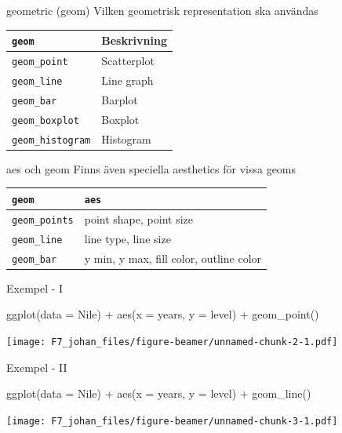 \documentclass[
  11pt,
  ignorenonframetext,
  handout]{beamer}
\newenvironment{Shaded}{\begin{snugshade}}{\end{snugshade}}
\newcommand{\AttributeTok}[1]{\textcolor[rgb]{0.77,0.63,0.00}{#1}}
\newcommand{\FunctionTok}[1]{\textcolor[rgb]{0.00,0.00,0.00}{#1}}
\newcommand{\NormalTok}[1]{#1}
\newcommand{\SpecialCharTok}[1]{\textcolor[rgb]{0.00,0.00,0.00}{#1}}
\begin{document}
\begin{frame}[fragile]{geometric (geom)}
\protect\hypertarget{geometric-geom}{}
Vilken geometrisk representation ska användas

\begin{longtable}[]{@{}ll@{}}
\toprule
\texttt{geom} & Beskrivning \\
\midrule
\endhead
\texttt{geom\_point} & Scatterplot \\
\texttt{geom\_line} & Line graph \\
\texttt{geom\_bar} & Barplot \\
\texttt{geom\_boxplot} & Boxplot \\
\texttt{geom\_histogram} & Histogram \\
\bottomrule
\end{longtable}
\end{frame}

\begin{frame}[fragile]{aes och geom}
\protect\hypertarget{aes-och-geom}{}
Finns även speciella aesthetics för vissa geoms

\begin{longtable}[]{@{}ll@{}}
\toprule
\texttt{geom} & \texttt{aes} \\
\midrule
\endhead
\texttt{geom\_points} & point shape, point size \\
\texttt{geom\_line} & line type, line size \\
\texttt{geom\_bar} & y min, y max, fill color, outline color \\
\bottomrule
\end{longtable}
\end{frame}

\begin{frame}[fragile]{Exempel - I}
\protect\hypertarget{exempel---i}{}
\begin{Shaded}
\begin{Highlighting}[]
\FunctionTok{ggplot}\NormalTok{(}\AttributeTok{data =}\NormalTok{ Nile) }\SpecialCharTok{+} 
  \FunctionTok{aes}\NormalTok{(}\AttributeTok{x =}\NormalTok{ years, }\AttributeTok{y =}\NormalTok{ level) }\SpecialCharTok{+} 
  \FunctionTok{geom\_point}\NormalTok{()}
\end{Highlighting}
\end{Shaded}

\texttt{[image: F7\_johan\_files/figure-beamer/unnamed-chunk-2-1.pdf]}
\end{frame}

\begin{frame}[fragile]{Exempel - II}
\protect\hypertarget{exempel---ii}{}
\begin{Shaded}
\begin{Highlighting}[]
\FunctionTok{ggplot}\NormalTok{(}\AttributeTok{data =}\NormalTok{ Nile) }\SpecialCharTok{+} 
  \FunctionTok{aes}\NormalTok{(}\AttributeTok{x =}\NormalTok{ years, }\AttributeTok{y =}\NormalTok{ level) }\SpecialCharTok{+} 
  \FunctionTok{geom\_line}\NormalTok{()}
\end{Highlighting}
\end{Shaded}

\texttt{[image: F7\_johan\_files/figure-beamer/unnamed-chunk-3-1.pdf]}
\end{frame}
\end{document}
